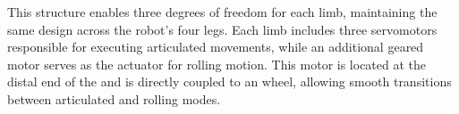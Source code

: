 %

This structure enables three degrees of freedom for each limb, maintaining the same design across the robot's four legs. Each limb includes three servomotors responsible for executing articulated movements, while an additional geared motor serves as the actuator for rolling motion. This motor is located at the distal end of the  and is directly coupled to an  wheel, allowing smooth transitions between articulated and rolling modes.
